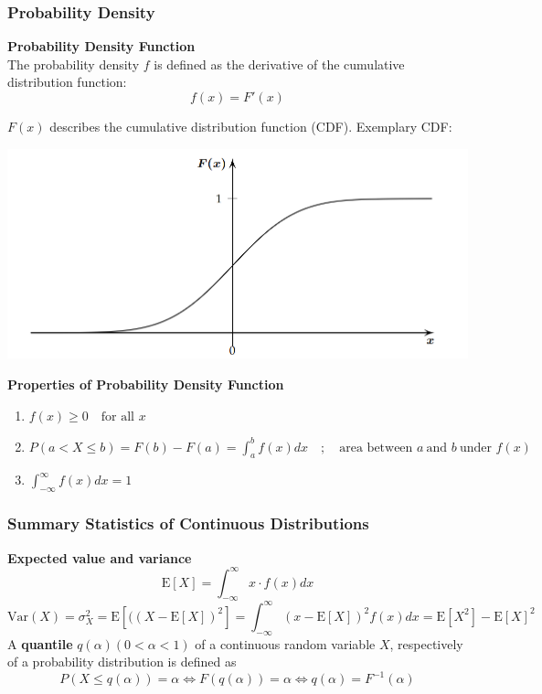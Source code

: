 \documentclass[11pt]{article}
\newcommand*\ev[1]{\mathrel{\text{E}\left[#1\right]}}
\begin{document}
\subsubsection{Probability Density}

\begin{definition}
	\textbf{Probability Density Function}\\
	The probability density $f$ is defined as the derivative of the cumulative distribution function:
	\begin{equation*}
		f(x) = F'(x)
	\end{equation*}
\end{definition}

$F(x)$ describes the cumulative distribution function (CDF). Exemplary CDF:

\begin{center}
	\includegraphics[width=0.5\linewidth]{img/cdf}
\end{center}

\begin{definition}
	\textbf{Properties of Probability Density Function}
	\begin{enumerate}
		\item $f(x) \geq 0\quad \text{for all }x$
		\item $P(a<X\leq b) = F(b) - F(a) = \int_{a}^{b}f(x) dx\quad;\quad \text{area between }a\ \text{and }b\ \text{under }f(x)$
		\item $ \int_{-\infty}^{\infty}f(x) dx = 1$
	\end{enumerate}
\end{definition}


\subsubsection{Summary Statistics of Continuous Distributions}

\begin{definition}
	\textbf{Expected value and variance}
	\begin{equation*}
		\ev{X} = \int_{-\infty}^{\infty} x\cdot f(x) dx
	\end{equation*}
	\begin{equation*}
		\text{Var}(X) = \sigma_X^2 = \ev{((X - \ev{X})^2} = \int_{-\infty}^{\infty} (x - \ev{X})^2 f(x) dx = \ev{X^2} - \ev{X}^2
	\end{equation*}
	A \textbf{quantile} $q(\alpha) (0<\alpha<1)$ of a continuous random variable $X$, respectively of a probability distribution is defined as
	\begin{equation*}
		P(X\leq q(\alpha)) = \alpha \Leftrightarrow F(q(\alpha)) = \alpha \Leftrightarrow q(\alpha) = F^{-1}(\alpha)
	\end{equation*}
\end{definition}
\end{document}

